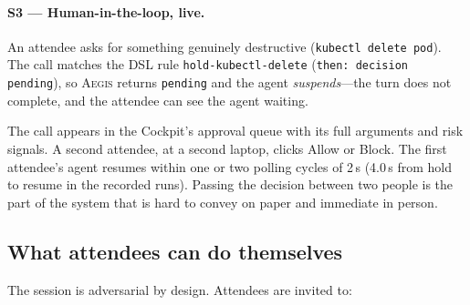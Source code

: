 \documentclass[sigconf,nonacm]{acmart}
\newcommand{\system}{\textsc{Aegis}\xspace}
\begin{document}
\paragraph{S3 --- Human-in-the-loop, live.}
An attendee asks for something genuinely destructive
(\texttt{kubectl delete pod}). The call matches the DSL rule
\texttt{hold-kubectl-delete} (\texttt{then: decision pending}), so
\system returns \texttt{pending} and the
agent \emph{suspends}---the turn does not complete, and the attendee can
see the agent waiting.

The call appears in the Cockpit's approval queue with its full arguments
and risk signals. A second attendee, at a second laptop, clicks Allow or
Block. The first attendee's agent resumes within one or two polling cycles of
2\,s (4.0\,s from hold to resume in the recorded runs). Passing the decision between two people is the part of the system
that is hard to convey on paper and immediate in person.

\subsection{What attendees can do themselves}

The session is adversarial by design. Attendees are invited to:
\end{document}
